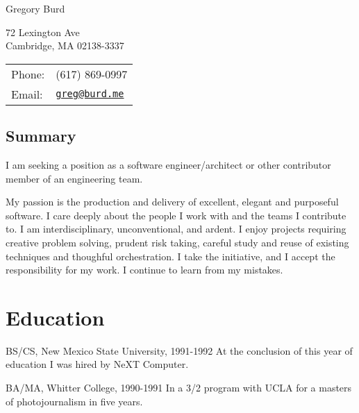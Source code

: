 \documentclass[letterpaper]{article}
\def\name{Gregory Burd}
\renewenvironment{itemize}{
  \begin{list}{}{
    \setlength{\leftmargin}{1.5em}
  }
}{
  \end{list}
}
\begin{document}
{\huge \name}


\vspace{0.25in}

\begin{minipage}{0.45\linewidth}
  72 Lexington Ave \\
  Cambridge, MA 02138-3337
\end{minipage}
\begin{minipage}{0.45\linewidth}
  \begin{tabular}{ll}
    Phone: & (617) 869-0997 \\
    Email: & \href{mailto:greg@burd.me}{\tt greg@burd.me} \\
  \end{tabular}
\end{minipage}

\vspace{0.25in}

\subsection*{Summary}

\begin{itemize}

\item I am seeking a position as a software engineer/architect or other
  contributor member of an engineering team.

\item My passion is the production and delivery of excellent, elegant and
  purposeful software. I care deeply about the people I work with and the teams
  I contribute to. I am interdisciplinary, unconventional, and ardent. I enjoy
  projects requiring creative problem solving, prudent risk taking, careful
  study and reuse of existing techniques and thoughful orchestration. I take
  the initiative, and I accept the responsibility for my work. I continue to
  learn from my mistakes.

\end{itemize}


\section*{Education}

\begin{itemize}
  \item BS/CS, New Mexico State University, 1991-1992
    At the conclusion of this year of education I was hired by NeXT Computer.

  \item BA/MA, Whitter College, 1990-1991
    In a 3/2 program with UCLA for a masters of photojournalism in five years.
\end{itemize}
\end{document}
